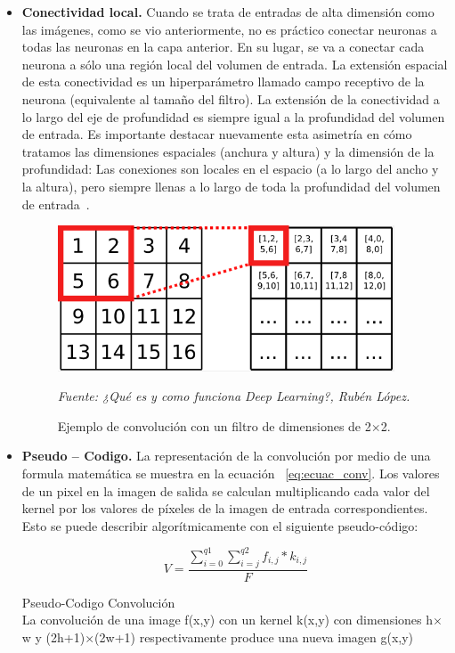\begin{itemize}
\item \textbf{Conectividad local.} Cuando se trata de entradas de alta dimensión como las imágenes, como se vio anteriormente, no es práctico conectar neuronas a todas las neuronas en la capa anterior. En su lugar, se va a conectar cada neurona a sólo una región local del volumen de entrada. La extensión espacial de esta
conectividad es un hiperparámetro llamado campo receptivo de la neurona (equivalente al tamaño del filtro). La extensión de la conectividad a lo largo del eje de profundidad es siempre igual a la profundidad del volumen de entrada. Es importante destacar nuevamente esta asimetría en cómo tratamos las dimensiones espaciales (anchura y altura) y la dimensión de la profundidad: Las conexiones son locales en el espacio (a lo largo del ancho y la altura), pero siempre llenas a lo largo de toda la profundidad del volumen de entrada~\cite{22RedesNeuronalesConvolu}.


\begin{figure}[H]
		\centering
		\includegraphics[width=100mm]{./Imagenes/convolucion.png}
		\caption{Ejemplo de convolución con un filtro de dimensiones de 2$\times$2.}
		\vspace{0.15cm}
		\textit{Fuente: ¿Qué es y como funciona Deep Learning?, Rubén López.}
        	\label{fig:convolucion}
\end{figure}


\item { \textbf{Pseudo – Codigo.} La representación de la convolución por medio de una formula matemática se muestra en la ecuación ~\ref{eq:ecuac_conv}. Los valores de un pixel en la imagen de salida se calculan multiplicando cada valor del kernel por los valores de píxeles de la imagen de entrada correspondientes. Esto se puede describir algorítmicamente con el siguiente pseudo-código:

\begin{equation}\label{eq:ecuac_conv}
V = \frac{\sum^{q1}_{i=0}\sum^{q2}_{i=j} f_{i,j}*k_{i,j}}{F}
\end{equation}

\begin{algorithm}
\caption{Pseudo-Codigo Convolución\\
La convolución de una image f(x,y) con un kernel k(x,y) con dimensiones h$\times$w y (2h+1)$\times$(2w+1) respectivamente produce una nueva imagen g(x,y)}\label{alg:euclid}
\begin{algorithmic}[H]


\end{algorithmic}
\end{algorithm}}
\end{itemize}
